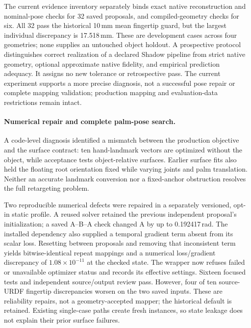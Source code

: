 The current evidence inventory separately binds exact native reconstruction and
nominal-pose checks for 32 saved proposals, and compiled-geometry checks for six.
All 32 pass the historical 10\,mm mean fingertip guard, but the largest individual
discrepancy is 17.518\,mm. These are development cases across four geometries;
none supplies an untouched object holdout. A prospective protocol distinguishes
correct realization of a declared Shadow pipeline from strict native geometry,
optional approximate native fidelity, and empirical prediction adequacy. It
assigns no new tolerance or retrospective pass. The current experiment supports
a more precise diagnosis, not a successful pose repair or complete mapping
validation; production mapping and evaluation-data restrictions remain intact.

\paragraph{Numerical repair and complete palm-pose search.}
A code-level diagnosis identified a mismatch between the production objective
and the surface contract: ten hand-landmark vectors are optimized without the
object, while acceptance tests object-relative surfaces. Earlier surface fits
also held the floating root orientation fixed while varying joints and palm
translation. Neither an accurate landmark conversion nor a fixed-anchor
obstruction resolves the full retargeting problem.

Two reproducible numerical defects were repaired in a separately versioned,
opt-in static profile. A reused solver retained the previous independent
proposal's initialization; a saved A--B--A check changed A by up to
0.192417\,rad. The installed dependency also supplied a temporal gradient term
absent from its scalar loss. Resetting between proposals and removing that
inconsistent term yields bitwise-identical repeat mappings and a numerical
loss/gradient discrepancy of $1.08\times10^{-11}$ at the checked state.
The wrapper now refuses failed or unavailable optimizer status and records its
effective settings. Sixteen focused tests and independent source/output review
pass. However, four of ten source-URDF fingertip discrepancies worsen on the two
saved inputs. These are reliability repairs, not a geometry-accepted mapper;
the historical default is retained. Existing single-case paths create fresh
instances, so state leakage does not explain their prior surface failures.

